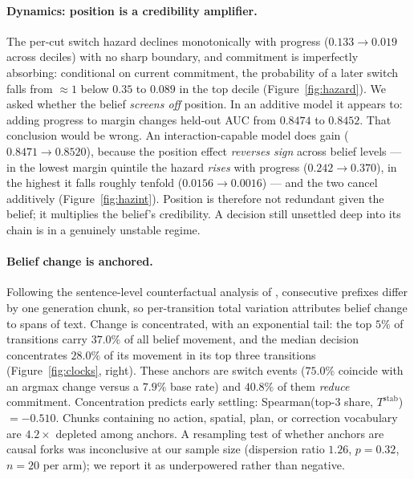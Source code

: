 \documentclass{article}
\newcommand{\Tstab}{T^{\mathrm{stab}}}
\begin{document}
\paragraph{Dynamics: position is a credibility amplifier.} The per-cut switch hazard
declines monotonically with progress ($0.133 \to 0.019$ across deciles) with no sharp
boundary, and commitment is imperfectly absorbing: conditional on current commitment, the
probability of a later switch falls from ${\approx}1$ below $0.35$ to $0.089$ in the top
decile (Figure~\ref{fig:hazard}). We asked whether the belief \emph{screens off} position.
In an additive model it appears to: adding progress to margin changes held-out AUC from
$0.8474$ to $0.8452$. That conclusion would be wrong. An interaction-capable model does
gain ($0.8471 \to 0.8520$), because the position effect \emph{reverses sign} across belief
levels --- in the lowest margin quintile the hazard \emph{rises} with progress
($0.242 \to 0.370$), in the highest it falls roughly tenfold ($0.0156 \to 0.0016$) --- and
the two cancel additively (Figure~\ref{fig:hazint}). Position is therefore not redundant
given the belief; it multiplies the belief's credibility. A decision still unsettled deep
into its chain is in a genuinely unstable regime.

\paragraph{Belief change is anchored.} Following the sentence-level counterfactual analysis
of \citet{anchors2025}, consecutive prefixes differ by one generation chunk,
so per-transition total variation attributes belief change to spans of text. Change is concentrated, with an exponential tail: the top $5\%$ of transitions carry $37.0\%$ of all belief movement, and the
median decision concentrates $28.0\%$ of its movement in its top three transitions
(Figure~\ref{fig:clocks}, right). These anchors are switch events ($75.0\%$ coincide with an
argmax change versus a $7.9\%$ base rate) and $40.8\%$ of them \emph{reduce} commitment.
Concentration predicts early settling: Spearman(top-3 share, $\Tstab$) $=-0.510$.
Chunks containing no action, spatial, plan, or correction vocabulary are $4.2\times$
depleted among anchors. A resampling test of whether anchors are causal forks was
inconclusive at our sample size (dispersion ratio $1.26$, $p=0.32$, $n=20$ per arm); we
report it as underpowered rather than negative.
\end{document}
